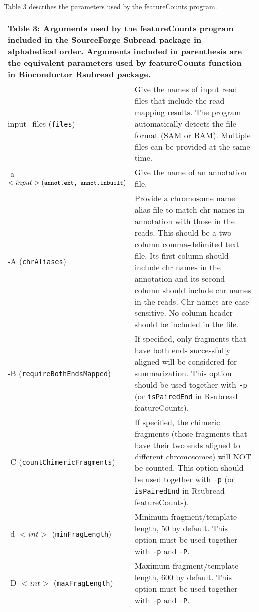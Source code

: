\documentclass[12pt]{report}
\newcommand{\code}[1]{{\small\texttt{#1}}}
\newcommand{\Subread}{\textsf{Subread}}
\newcommand{\Rsubread}{\textsf{Rsubread}}
\newcommand{\featureCounts}{\textsf{featureCounts}}
\begin{document}
Table 3 describes the parameters used by the {\featureCounts} program.

\pagebreak

\begin{longtable}{|p{5cm}|p{11cm}|}
\multicolumn{2}{p{16cm}}{Table 3: Arguments used by the {\featureCounts} program included in the SourceForge {\Subread} package in alphabetical order.
Arguments included in parenthesis are the equivalent parameters used by {\featureCounts} function in Bioconductor {\Rsubread} package.}
\endfirsthead
\hline
Arguments & Description \\
\hline
input\_files \newline (\code{files}) & Give the names of input read files that include the read mapping results. The program automatically detects the file format (SAM or BAM). Multiple files can be provided at the same time.\\
\hline
-a $<input> \newline (\code{annot.ext, annot.inbuilt})  $ & Give the name of an annotation file. \\
\hline
-A \newline (\code{chrAliases}) & Provide a chromosome name alias file to match chr names in annotation with those in the reads. This should be a two-column comma-delimited text file. Its first column should include chr names in the annotation and its second column should include chr names in the reads. Chr names are case sensitive. No column header should be included in the file.\\
\hline
-B \newline (\code{requireBothEndsMapped}) & If specified, only fragments that have both ends successfully aligned will be considered for summarization. This option should be used together with \code{-p} (or \code{isPairedEnd} in {\Rsubread} {\featureCounts}).\\
\hline
-C \newline (\code{countChimericFragments}) & If specified, the chimeric fragments (those fragments that have their two ends aligned to different chromosomes) will NOT be counted. This option should be used together with \code{-p} (or \code{isPairedEnd} in {\Rsubread} {\featureCounts}).\\
\hline
-d $<int>$ \newline (\code{minFragLength}) & Minimum fragment/template length, 50 by default. This option must be used together with \code{-p} and \code{-P}.\\
\hline
-D $<int>$ \newline (\code{maxFragLength}) & Maximum fragment/template length, 600 by default. This option must be used together with \code{-p} and \code{-P}.\\

\end{longtable}
\end{document}
